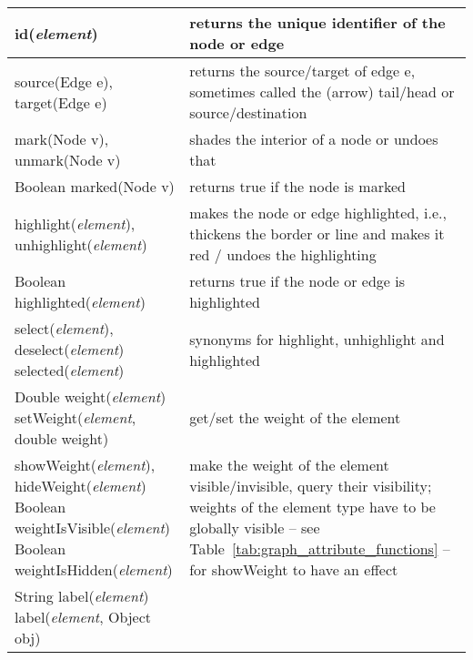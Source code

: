 \begin{table}
  \small
  \centering
  \begin{tabular}{| m{} | m{} |}
    \hline
    \textsf{id(\emph{element})}
    &
    returns the unique identifier of the node or edge
    \\ \hline
    \textsf{source(Edge e)}, \textsf{target(Edge e)}
    &
    returns the source/target of edge \textsf{e}, sometimes called the (arrow)
    tail/head or source/destination
    \\ \hline
    \textsf{mark(Node v), unmark(Node v)}
    &
    shades the interior of a node or undoes that
    \\ \hline
    \textsf{Boolean marked(Node v)}
    &
    returns \textsf{true} if the node is marked
    \\ \hline
    \textsf{highlight(\emph{element}), unhighlight(\emph{element})}
    &
    makes the node or edge highlighted, i.e.,
    thickens the border or line and makes it red / undoes the highlighting
    \\ \hline
    \textsf{Boolean highlighted(\emph{element})}
    &
    returns \textsf{true} if the node or edge is highlighted
    \\ \hline
    \shortstack[l]{
      \textsf{select(\emph{element})}, \textsf{deselect(\emph{element})}\\
      \textsf{selected(\emph{element})}
    }
    &
    synonyms for \textsf{highlight}, \textsf{unhighlight} and \textsf{highlighted}
    \\ \hline
    \shortstack[l]{
      \textsf{Double weight(\emph{element})}\\
      \textsf{setWeight(\emph{element}, double weight)}
    }
    &
    get/set the weight of the element
    \\ \hline
    \shortstack[l]{
      \textsf{showWeight(\emph{element})},
      \textsf{hideWeight(\emph{element})}\\
      \textsf{Boolean weightIsVisible(\emph{element})}\\
      \textsf{Boolean weightIsHidden(\emph{element})}
    }
    &
    make the weight of the element visible/invisible,
    query their visibility; weights of the element type
    have to be
    globally visible -- see Table~\ref{tab:graph_attribute_functions}
    -- for \textsf{showWeight} to have an effect
    \\ \hline
    \shortstack[l]{
      \textsf{String label(\emph{element})}\\
      \textsf{label(\emph{element}, Object obj)}
}
\end{tabular}
\end{table}
